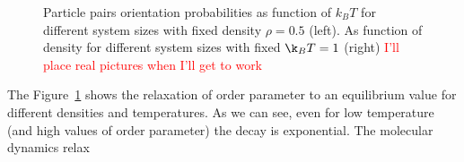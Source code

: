 \documentclass[12pt, a4paper]{article}
\newcommand{\figref}[1]{Figure~\ref{#1}}
\begin{document}
\begin{figure}
\begin{subfigure}{.45\textwidth}
 \end{subfigure}
 \captionsetup{justification=centering, width=0.9\columnwidth}
 \caption{Particle pairs orientation probabilities as function of $k_BT$ for different system sizes with fixed density $\rho = 0.5$ (left). As function of density for different system sizes with fixed $\k_BT = 1$ (right) \textcolor{red}{I'll place real pictures when I'll get to work}}
 \label{fig:equilibrium_orientation_prob}
\end{figure}

The \figref{fig:equilibrium_orientation_prob} shows the relaxation of order parameter to an equilibrium value for different densities and temperatures. As we can see, even for low temperature (and high values of order parameter) the decay is exponential. The molecular dynamics relax 
\end{document}
